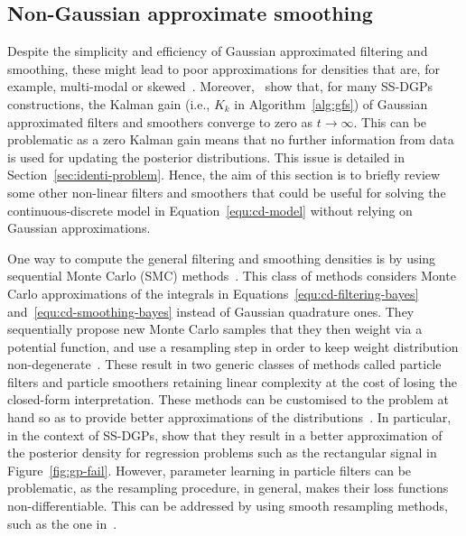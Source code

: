 \subsection{Non-Gaussian approximate smoothing}
\label{sec:other-filters-smoothers}
Despite the simplicity and efficiency of Gaussian approximated filtering and smoothing, these might lead to poor approximations for densities that are, for example, multi-modal or skewed~\citep{Sarkka2013}. Moreover,~\citet{Zhao2020SSDGP} show that, for many SS-DGPs constructions, the Kalman gain (i.e., $K_k$ in Algorithm~\ref{alg:gfs}) of Gaussian approximated filters and smoothers converge to zero as $t\to\infty$. This can be problematic as a zero Kalman gain means that no further information from data is used for updating the posterior distributions. This issue is detailed in Section~\ref{sec:identi-problem}. Hence, the aim of this section is to briefly review some other non-linear filters and smoothers that could be useful for solving the continuous-discrete model in Equation~\eqref{equ:cd-model} without relying on Gaussian approximations.  

One way to compute the general filtering and smoothing densities is by using sequential Monte Carlo (SMC) methods~\citep{Chopin2020}. This class of methods considers Monte Carlo approximations of the integrals in Equations~\eqref{equ:cd-filtering-bayes} and~\eqref{equ:cd-smoothing-bayes} instead of Gaussian quadrature ones. They sequentially propose new Monte Carlo samples that they then weight via a potential function, and use a resampling step in order to keep weight distribution non-degenerate~\citep{Docet2000, Simon2004, Christophe2010}. These result in two generic classes of methods called particle filters and particle smoothers retaining linear complexity at the cost of losing the closed-form interpretation. These methods can be customised to the problem at hand so as to provide better approximations of the distributions~\citep{Chopin2020}. In particular, in the context of SS-DGPs, \citet{Zhao2020SSDGP} show that they result in a better approximation of the posterior density for regression problems such as the rectangular signal in Figure~\ref{fig:gp-fail}. However, parameter learning in particle filters can be problematic, as the resampling procedure, in general, makes their loss functions non-differentiable. This can be addressed by using smooth resampling methods, such as the one in~\citet{Corenflos2021OT}.

